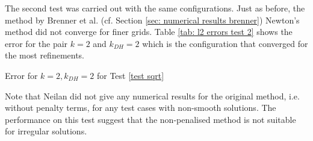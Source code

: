 
The second test was carried out with the same configurations. Just as before, the method by Brenner et al. (cf. Section \ref{sec: numerical results brenner}) Newton's method did not converge for finer grids. 
Table \ref{tab: l2 errors test 2} shows the error for the pair $k=2$ and $k_{DH}=2$ which is the configuration that converged for the most refinements.

\begin{table}[H]
		\centering
		\pgfplotstabletypeset[
		columns={iterations, l2error, h1error,N},
		every row 0 column 0/.style={set content=init},
		]{\MATwodegTwoTwo}
		\caption{Error for $k=2, k_{DH}=2$ for Test \ref{test sqrt}}
	\label{tab: l2 errors test 2}
\end{table}
 
Note that Neilan did not give any numerical results for the original method, i.e. without penalty terms, for any test cases with non-smooth solutions. The performance on this test suggest that the non-penalised method is not suitable for irregular solutions. 



